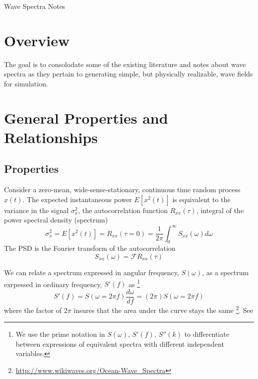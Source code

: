 \documentclass[11pt]{article}
\newcommand{\proposaltitle}{Wave Spectra Notes}
\begin{document}
\newpage
\setcounter{page}{1}
\begin{center}
{\huge \proposaltitle}
\end{center}

\section{Overview}
The goal is to consolodate some of the existing literature and notes about wave spectra as they pertain to generating simple, but physically realizable, wave fields for simulation.

\section{General Properties and Relationships}

\subsection{Properties}
Consider a zero-mean, wide-sense-stationary, continuous time random process $x(t)$.  The expected instantaneous power $E[x^2(t)]$ is equivalent to the variance in the signal $\sigma_x^2$, the autocorrelation function $R_{xx}(\tau)$, integral of the power spectral density (spectrum)
\[
\sigma_x^2 = E[x^2(t)] = R_{xx}(\tau=0) = \frac{1}{2\pi} \int_0^{\infty}S_{xx}(\omega)d\omega
\]
The PSD is the Fourier transform of the autocorrelation
\[
S_{xx}(\omega) = \mathcal{F} R_{xx}(\tau)
\]

We can relate a spectrum expressed in angular frequency, $S(\omega)$, as a spectrum exrpessed in ordinary frequency, $S'(f)$ as \footnote{We use the prime notation  in $S(\omega)$, $S'(f)$, $S''(k)$ to differentiate between expressions of equivalent spectra with different independent variables.}
\begin{equation} S'(f) = S(\omega=2 \pi f) \frac{d\omega}{df} = (2 \pi) S(\omega=2 \pi f)\end{equation}
where the factor of $2 \pi$ insures that the area under the curve stays the same \footnote{\url{http://www.wikiwaves.org/Ocean-Wave_Spectra}}.  See 
\end{document}
